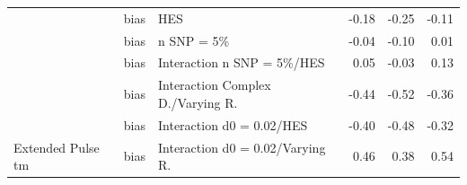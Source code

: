 \documentclass[11pt]{article}
\begin{document}
\begin{table}[H]
\begin{tabular}[t]{l|l|l|r|r|r}
 & bias & HES & -0.18 & -0.25 & -0.11\\

 & bias & n SNP = 5\% & -0.04 & -0.10 & 0.01\\

 & bias & Interaction n SNP = 5\%/HES & 0.05 & -0.03 & 0.13\\

 & bias & Interaction Complex D./Varying R. & -0.44 & -0.52 & -0.36\\

 & bias & Interaction d0 = 0.02/HES & -0.40 & -0.48 & -0.32\\

\multirow{-11}{*}{\raggedright\arraybackslash Extended Pulse tm} & bias & Interaction d0 = 0.02/Varying R. & 0.46 & 0.38 & 0.54\\
\hline
\end{tabular}
\end{table}
\end{document}
